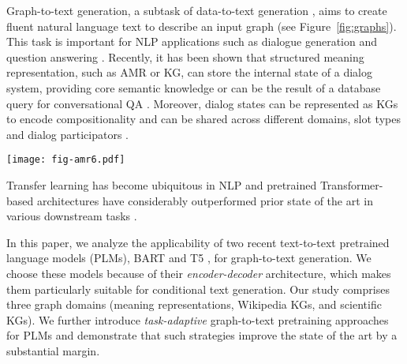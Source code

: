 \documentclass[11pt]{article}
\begin{document}
Graph-to-text generation, a subtask of data-to-text generation \cite{10.5555/3241691.3241693}, aims to create fluent natural language text to describe an input graph (see Figure~\ref{fig:graphs}). This task is important for NLP applications such as dialogue generation \cite{moon-etal-2019-opendialkg} and question answering \cite{duan-etal-2017-question}. Recently, it has been shown that structured meaning representation, such as AMR or KG, can store the internal state of a dialog system, providing core semantic knowledge \cite{bonial-etal-2020-dialogue, bai-etal-2021-semantic} or can be the result of a database query for conversational QA \cite{yu-etal-2019-cosql}. Moreover, dialog states can be represented as KGs to encode compositionality and can be shared across different domains, slot types and dialog participators \cite{cheng-etal-2020-conversational}.

 \begin{figure*}[t]
    \centering
    \texttt{[image: fig-amr6.pdf]}
    \caption{Examples of (a) AMR and (b) WebNLG graphs, the input for the models and the reference texts.}
    \label{fig:graphs}
\end{figure*}

Transfer learning has become ubiquitous in NLP and pretrained Transformer-based architectures \cite{NIPS2017_7181} have considerably outperformed prior state of the art in various downstream tasks \cite{devlin-etal-2019-bert, NEURIPS2019_dc6a7e65, liu2020roberta, radford2019language}. 




In this paper, we analyze the applicability of two recent text-to-text pretrained language models (PLMs), BART \cite{lewis2019bart} and T5 \cite{2019t5}, for graph-to-text generation. We choose these models because of their \emph{encoder-decoder} architecture, which makes them particularly suitable for conditional text generation. Our study comprises three graph domains (meaning representations, Wikipedia KGs, and scientific KGs). We further introduce \emph{task-adaptive} graph-to-text pretraining approaches for PLMs and demonstrate that such strategies improve the state of the art by a substantial margin.
\end{document}
